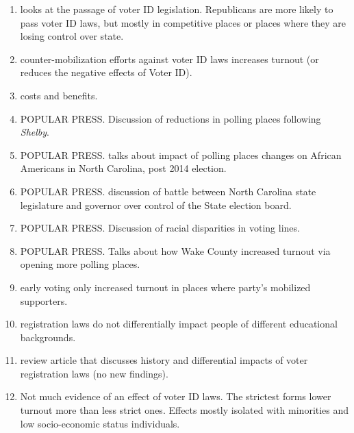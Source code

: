 \documentclass[12pt]{article}
\begin{document}
\begin{enumerate}
\item \citet{hicks2015principle} looks at the passage of voter ID legislation. Republicans are more likely to pass voter ID laws, but mostly in competitive places or places where they are losing control over state. 

\item \citet{citrin2014effects} counter-mobilization efforts against voter ID laws increases turnout (or reduces the negative effects of Voter ID). 

\item \citet{downs1957} costs and benefits. 

\item \citet{berman2016} POPULAR PRESS. Discussion of reductions in polling places following \textit{Shelby}. 

\item \citet{roth2015} POPULAR PRESS. talks about impact of polling places changes on African Americans in North Carolina, post 2014 election. 

\item \citet{ap2018} POPULAR PRESS. discussion of battle between North Carolina state legislature and governor over control of the State election board. 


\item \citet{vasilogambros2018} POPULAR PRESS. Discussion of racial disparities in voting lines. 

\item \citet{gargan2017} POPULAR PRESS. Talks about how Wake County increased turnout via opening more polling places. 

\item \citet{oliver1996effects} early voting only increased turnout in places where party's mobilized supporters. 

\item \citet{nagler1991effect} registration laws do not differentially impact people of different educational backgrounds. 

\item \citet{hershey2009we} review article that discusses history and differential impacts of voter registration laws (no new findings). 

\item \citet{alvarez2008effect} Not much evidence of an effect of voter ID laws. The strictest forms lower turnout more than less strict ones. Effects mostly isolated with minorities and low socio-economic status individuals. 


\end{enumerate}
\end{document}
